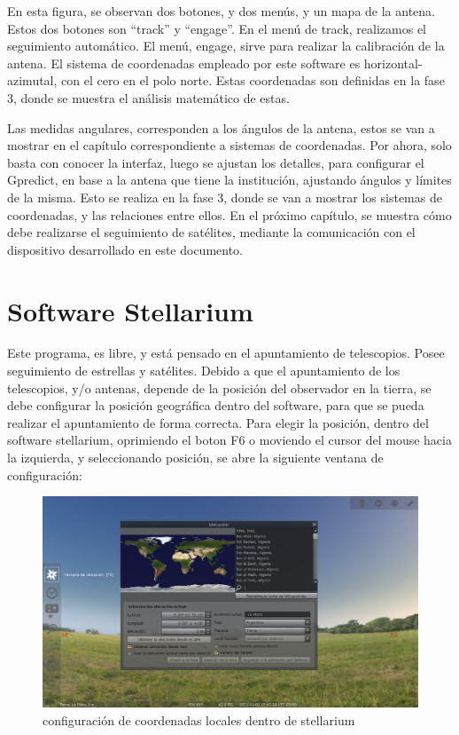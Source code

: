 En esta figura, se observan dos botones, y dos menús, y un mapa de la antena. Estos dos botones son ``track'' y ``engage''. En el menú de track, realizamos el seguimiento automático. El menú, engage, sirve para realizar la calibración de la antena. El sistema de coordenadas empleado por este software es horizontal-azimutal, con el cero en el polo norte. Estas coordenadas son definidas en la fase 3, donde se muestra el análisis matemático de estas.  

Las medidas angulares, corresponden a los ángulos de la antena, estos se van a mostrar en el capítulo correspondiente a sistemas de coordenadas. Por ahora, solo basta con conocer la interfaz, luego se ajustan los detalles, para configurar el Gpredict, en base a la antena que tiene la institución, ajustando ángulos y límites de la misma. Esto se realiza en la fase 3, donde se van a mostrar los sistemas de coordenadas, y las relaciones entre ellos. En el próximo capítulo, se muestra cómo debe realizarse el seguimiento de satélites, mediante la comunicación con el dispositivo desarrollado en este documento. 



 
\section{Software Stellarium} 


Este programa, es libre, y está pensado en el apuntamiento de telescopios. Posee seguimiento de estrellas y satélites. Debido a que el apuntamiento de los telescopios, y/o antenas, depende de la posición del observador en la tierra, se debe configurar la posición geográfica dentro del software, para que se pueda realizar el apuntamiento de forma correcta. Para elegir la posición, dentro del software stellarium, oprimiendo el boton F6 o moviendo el cursor del mouse hacia la izquierda, y seleccionando posición, se abre la siguiente ventana de configuración: 
\begin{figure}[ht]
	\includegraphics[width=\textwidth]{stel_sel_pos} 
	\caption{configuración de coordenadas locales dentro de stellarium} 
	\label{fig:stell_poss_conf}
\end{figure}

